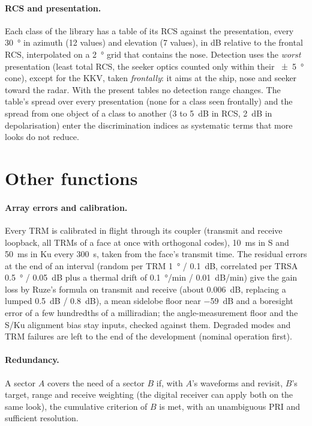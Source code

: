\documentclass[11pt,a4paper]{article}
\begin{document}
\paragraph{RCS and presentation.} Each class of the library has a table of its RCS against the presentation, every
\SI{30}{\degree} in azimuth (12 values) and elevation (7 values), in dB relative to the frontal RCS, interpolated on a
\SI{2}{\degree} grid that contains the nose. Detection uses the \emph{worst} presentation (least total RCS, the seeker
optics counted only within their \SI{\pm5}{\degree} cone), except for the KKV, taken \emph{frontally}: it aims at the
ship, nose and seeker toward the radar. With the present tables no detection range changes. The table's spread over every presentation (none for a class seen frontally) and
the spread from one object of a class to another (3 to \SI{5}{dB} in RCS, \SI{2}{dB} in depolarisation) enter the
discrimination indices as systematic terms that more looks do not reduce.

\section{Other functions}
\paragraph{Array errors and calibration.}\label{sec:cal} Every TRM is calibrated in flight through its coupler (transmit and receive
loopback, all TRMs of a face at once with orthogonal codes), \SI{10}{ms} in S and \SI{50}{ms} in Ku every \SI{300}{s},
taken from the face's transmit time. The residual errors at the end of an interval (random per TRM \SI{1}{\degree} /
\SI{0.1}{dB}, correlated per TRSA \SI{0.5}{\degree} / \SI{0.05}{dB} plus a thermal drift of \SI{0.1}{\degree/min} /
\SI{0.01}{dB/min}) give the gain loss by Ruze's formula on transmit and receive (about \SI{0.006}{dB}, replacing a lumped
\SI{0.5}{dB} / \SI{0.8}{dB}), a mean sidelobe floor near \SI{-59}{dB} and a boresight error of a few hundredths of a
milliradian; the angle-measurement floor and the S/Ku alignment bias stay inputs, checked against them. Degraded
modes and TRM failures are left to the end of the development (nominal operation first).

\paragraph{Redundancy.} A sector $A$ covers the need of a sector $B$ if, with $A$'s waveforms and revisit, $B$'s target,
range and receive weighting (the digital receiver can apply both on the same look), the cumulative criterion of $B$ is
met, with an unambiguous PRI and sufficient resolution.
\end{document}

